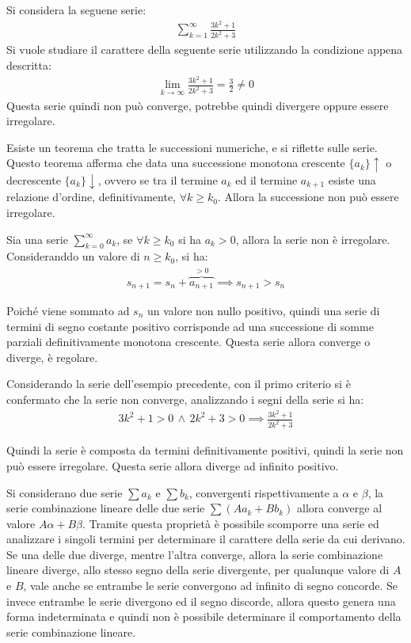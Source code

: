 \documentclass{article}
\numberwithin{equation}{subsection}
\begin{document}

Si considera la seguene serie:
\begin{gather*}
    \displaystyle\sum_{k=1}^\infty\frac{3k^2+1}{2k^2+3}
\end{gather*}
Si vuole studiare il carattere della seguente serie utilizzando la condizione appena descritta:
\begin{gather*}
    \lim_{k\to\infty}\displaystyle\frac{3k^2+1}{2k^2+3}=\frac{3}{2}\neq0
\end{gather*}
Questa serie quindi non può converge, potrebbe quindi divergere oppure essere irregolare. 


Esiste un teorema che tratta le successioni numeriche, e si riflette sulle serie. Questo teorema afferma che data una successione monotona crescente $\{a_k\}\uparrow$ o decrescente $\{a_k\}\downarrow$, ovvero se tra il termine $a_k$ ed il termine $a_{k+1}$ esiste una relazione d'ordine, definitivamente, $\forall k\geq k_0$. Allora la successione non può essere irregolare. 

Sia una serie $\sum_{k=0}^\infty a_k$, se $\forall k\geq k_0$ si ha $a_k>0$, allora la serie non è irregolare. Consideranddo un valore di $n\geq k_0$, si ha:
\begin{gather*}
    s_{n+1}=s_n+\overbrace{a_{n+1}}^{>0}\implies s_{n+1}>s_n
\end{gather*}

Poiché viene sommato ad $s_n$ un valore non nullo positivo, quindi una serie di termini di segno costante positivo corrisponde ad una successione di somme parziali definitivamente monotona crescente. Questa serie allora converge o diverge, è regolare. 

Considerando la serie dell'esempio precedente, con il primo criterio si è confermato che la serie non converge, analizzando i segni della serie si ha:
\begin{gather*}
    3k^2+1>0\,\land\,2k^2+3>0\implies\displaystyle\frac{3k^2+1}{2k^2+3}
\end{gather*}

Quindi la serie è composta da termini definitivamente positivi, quindi la serie non può essere irregolare. Questa serie allora diverge ad infinito positivo. 


Si considerano due serie $\sum a_k$ e $\sum b_k$, convergenti rispettivamente a $\alpha$ e $\beta$, la serie combinazione lineare delle due serie $\sum(Aa_k+Bb_k)$ allora converge al valore $A\alpha+B\beta$. Tramite questa proprietà è possibile scomporre una serie ed analizzare i singoli termini per determinare il carattere della serie da cui derivano. Se una delle due diverge, mentre l'altra converge, allora la serie combinazione lineare diverge, allo stesso segno della serie divergente, per qualunque valore di $A$ e $B$, vale anche se entrambe le serie convergono ad infinito di segno concorde. Se invece entrambe le serie divergono ed il segno discorde, allora questo genera una forma indeterminata e quindi non è possibile determinare il comportamento della serie combinazione lineare. 
\end{document}
